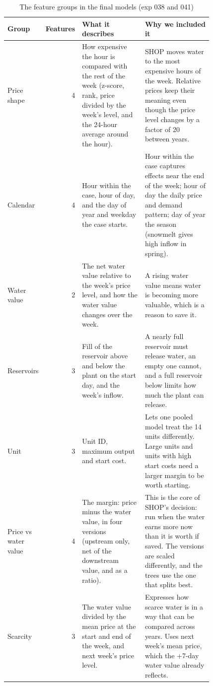 \begin{table}[H]
  \centering\small
  \caption{The feature groups in the final models (exp 038 and 041)}
  \label{tab:4.groups}
  \begin{tabular}{>{\raggedright\arraybackslash}p{0.15\linewidth}r>{\raggedright\arraybackslash}p{0.32\linewidth}>{\raggedright\arraybackslash}p{0.35\linewidth}}
    \toprule
    \textbf{Group} & \textbf{Features} & \textbf{What it describes} & \textbf{Why we included it} \\
    \midrule
    Price shape & 4 & How expensive the hour is compared with the rest of the week (z-score, rank, price divided by the week's level, and the 24-hour average around the hour). & SHOP moves water to the most expensive hours of the week. Relative prices keep their meaning even though the price level changes by a factor of 20 between years. \\
    Calendar & 4 & Hour within the case, hour of day, and the day of year and weekday the case starts. & Hour within the case captures effects near the end of the week; hour of day the daily price and demand pattern; day of year the season (snowmelt gives high inflow in spring). \\
    Water value & 2 & The net water value relative to the week's price level, and how the water value changes over the week. & A rising water value means water is becoming more valuable, which is a reason to save it. \\
    Reservoirs & 3 & Fill of the reservoir above and below the plant on the start day, and the week's inflow. & A nearly full reservoir must release water, an empty one cannot, and a full reservoir below limits how much the plant can release. \\
    Unit & 3 & Unit ID, maximum output and start cost. & Lets one pooled model treat the 14 units differently. Large units and units with high start costs need a larger margin to be worth starting. \\
    Price vs water value & 4 & The margin: price minus the water value, in four versions (upstream only, net of the downstream value, and as a ratio). & This is the core of SHOP's decision: run when the water earns more now than it is worth if saved. The versions are scaled differently, and the trees use the one that splits best. \\
    Scarcity & 3 & The water value divided by the mean price at the start and end of the week, and next week's price level. & Expresses how scarce water is in a way that can be compared across years. Uses next week's mean price, which the +7-day water value already reflects. \\

\end{tabular}
\end{table}
